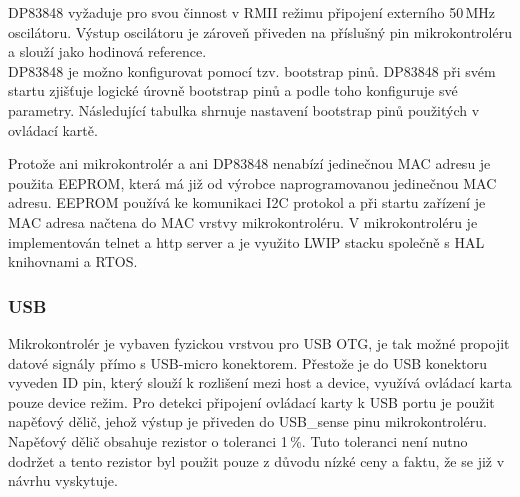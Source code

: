     DP83848 vyžaduje pro svou činnost v RMII režimu připojení externího 50\,MHz oscilátoru.
    Výstup oscilátoru je zároveň přiveden na příslušný pin mikrokontroléru a slouží jako 
    hodinová reference.\\ 

    DP83848 je možno konfigurovat pomocí tzv. bootstrap pinů. DP83848 při svém startu zjišťuje
    logické úrovně bootstrap pinů a podle toho konfiguruje své parametry. Následující tabulka
    shrnuje nastavení bootstrap pinů použitých v ovládací kartě.

    \begin{table}[ht!]
        \caption{Nastavení bootstrap pinů DP83848}
        \label{RMII settings}
        \end{table}


    Protože ani mikrokontrolér a ani DP83848 nenabízí jedinečnou MAC adresu je použita EEPROM,
    která má již od výrobce naprogramovanou jedinečnou MAC adresu.
    EEPROM používá ke komunikaci I2C protokol a při startu zařízení je MAC adresa
    načtena do MAC vrstvy mikrokontroléru. V mikrokontroléru je implementován telnet
    a http server a je využito LWIP stacku společně s HAL knihovnami a RTOS.\\

    \subsubsection{USB}
    Mikrokontrolér je vybaven fyzickou vrstvou pro USB OTG,
    je tak možné propojit datové signály přímo s USB-micro konektorem.
    Přestože je do USB konektoru vyveden ID pin, který slouží
    k rozlišení mezi host a device, využívá ovládací karta pouze device režim.
    Pro detekci připojení ovládací karty k USB portu je použit napěťový dělič, jehož výstup
    je přiveden do USB\_sense pinu mikrokontroléru. Napěťový dělič obsahuje rezistor o toleranci
    1\,\%. Tuto toleranci není nutno dodržet a tento rezistor byl použit pouze z důvodu nízké ceny
    a faktu, že se již v návrhu vyskytuje.\\

